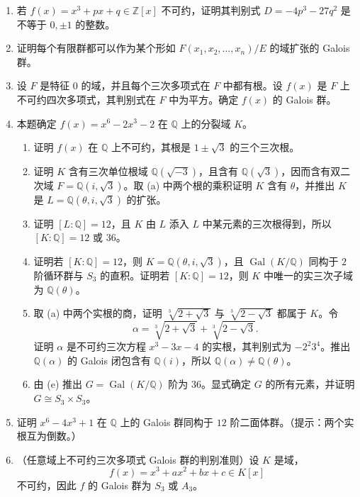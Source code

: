 \begin{enumerate}[label=\arabic*.]
	\[
	\alpha_1\alpha_2+\alpha_3\alpha_4,
	\quad
	\alpha_1\alpha_3+\alpha_2\alpha_4,
	\quad
	\alpha_1\alpha_4+\alpha_2\alpha_3
	\]
	被 $f(x)$ 的 Galois 群置换。推出这些元素是某个有理系数三次多项式的根（这也常称为 $f(x)$ 的预解三次方程）。
	\item 若 $f(x)=x^3+px+q\in\mathbb Z[x]$ 不可约，证明其判别式 $D=-4p^3-27q^2$ 是不等于 $0,\pm1$ 的整数。
	\item 证明每个有限群都可以作为某个形如 $F(x_1,x_2,
	\ldots,x_n)/E$ 的域扩张的 Galois 群。
	\item 设 $F$ 是特征 $0$ 的域，并且每个三次多项式在 $F$ 中都有根。设 $f(x)$ 是 $F$ 上不可约四次多项式，其判别式在 $F$ 中为平方。确定 $f(x)$ 的 Galois 群。
	\item 本题确定 $f(x)=x^6-2x^3-2$ 在 $\mathbb Q$ 上的分裂域 $K$。
	\begin{enumerate}[label=(\alph*)]
		\item 证明 $f(x)$ 在 $\mathbb Q$ 上不可约，其根是 $1\pm\sqrt3$ 的三个三次根。
		\item 证明 $K$ 含有三次单位根域 $\mathbb Q(\sqrt{-3})$，且含有 $\mathbb Q(\sqrt3)$，因而含有双二次域 $F=\mathbb Q(i,\sqrt3)$。取 (a) 中两个根的乘积证明 $K$ 含有 $\theta$，并推出 $K$ 是 $L=\mathbb Q(\theta,i,\sqrt3)$ 的扩张。
		\item 证明 $[L:\mathbb Q]=12$，且 $K$ 由 $L$ 添入 $L$ 中某元素的三次根得到，所以 $[K:\mathbb Q]=12$ 或 $36$。
		\item 证明若 $[K:\mathbb Q]=12$，则 $K=\mathbb Q(\theta,i,\sqrt3)$，且 $\operatorname{Gal}(K/\mathbb Q)$ 同构于 $2$ 阶循环群与 $S_3$ 的直积。证明若 $[K:\mathbb Q]=12$，则 $K$ 中唯一的实三次子域为 $\mathbb Q(\theta)$。
		\item 取 (a) 中两个实根的商，证明 $\sqrt[3]{2+\sqrt3}$ 与 $\sqrt[3]{2-\sqrt3}$ 都属于 $K$。令
		\[
		\alpha=\sqrt[3]{2+\sqrt3}+\sqrt[3]{2-\sqrt3}.
		\]
		证明 $\alpha$ 是不可约三次方程 $x^3-3x-4$ 的实根，其判别式为 $-2^2 3^4$。推出 $\mathbb Q(\alpha)$ 的 Galois 闭包含有 $\mathbb Q(i)$，所以 $\mathbb Q(\alpha)\ne\mathbb Q(\theta)$。
		\item 由 (e) 推出 $G=\operatorname{Gal}(K/\mathbb Q)$ 阶为 $36$。显式确定 $G$ 的所有元素，并证明 $G\cong S_3\times S_3$。
	\end{enumerate}
	\item 证明 $x^6-4x^3+1$ 在 $\mathbb Q$ 上的 Galois 群同构于 $12$ 阶二面体群。（提示：两个实根互为倒数。）
	\item（任意域上不可约三次多项式 Galois 群的判别准则）设 $K$ 是域，
	\[
	f(x)=x^3+ax^2+bx+c\in K[x]
	\]
	不可约，因此 $f$ 的 Galois 群为 $S_3$ 或 $A_3$。

\end{enumerate}
